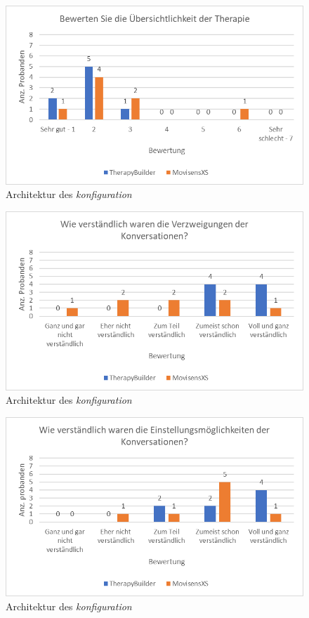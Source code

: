 \begin{figure}[!h]
\centering
\includegraphics[width=1\textwidth]{pictures/diagramme/therapieuebersicht}
\caption{Architektur des \emph{konfiguration}}
\label{therapieuebersicht}
\end{figure}

\begin{figure}[!h]
\centering
\includegraphics[width=1\textwidth]{pictures/diagramme/konversationverzweigung}
\caption{Architektur des \emph{konfiguration}}
\label{konversationverzweigung}
\end{figure}

\begin{figure}[!h]
\centering
\includegraphics[width=1\textwidth]{pictures/diagramme/konversationeinstellung}
\caption{Architektur des \emph{konfiguration}}
\label{konversationeinstellung}
\end{figure}


